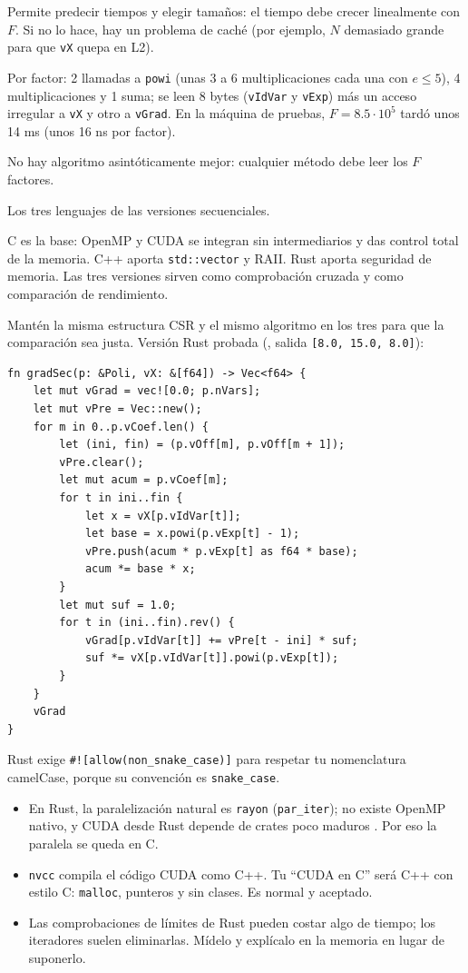 \porque Permite predecir tiempos y elegir tamaños: el tiempo debe crecer linealmente con $F$. Si no lo hace, hay un problema de caché (por ejemplo, $N$ demasiado grande para que \texttt{vX} quepa en L2).

\como Por factor: 2 llamadas a \texttt{powi} (unas 3 a 6 multiplicaciones cada una con $e\le5$), 4 multiplicaciones y 1 suma; se leen 8 bytes (\texttt{vIdVar} y \texttt{vExp}) más un acceso irregular a \texttt{vX} y otro a \texttt{vGrad}. En la máquina de pruebas, $F=8.5\cdot10^5$ tardó unos 14 ms (unos 16 ns por factor).

\alt No hay algoritmo asintóticamente mejor: cualquier método debe leer los $F$ factores.

\que Los tres lenguajes de las versiones secuenciales.

\porque C es la base: OpenMP y CUDA se integran sin intermediarios y das control total de la memoria. C++ aporta \texttt{std::vector} y RAII. Rust aporta seguridad de memoria. Las tres versiones sirven como comprobación cruzada y como comparación de rendimiento.

\como Mantén la misma estructura CSR y el mismo algoritmo en los tres para que la comparación sea justa. Versión Rust probada (, salida \texttt{[8.0, 15.0, 8.0]}):
\begin{lstlisting}
fn gradSec(p: &Poli, vX: &[f64]) -> Vec<f64> {
    let mut vGrad = vec![0.0; p.nVars];
    let mut vPre = Vec::new();
    for m in 0..p.vCoef.len() {
        let (ini, fin) = (p.vOff[m], p.vOff[m + 1]);
        vPre.clear();
        let mut acum = p.vCoef[m];
        for t in ini..fin {
            let x = vX[p.vIdVar[t]];
            let base = x.powi(p.vExp[t] - 1);
            vPre.push(acum * p.vExp[t] as f64 * base);
            acum *= base * x;
        }
        let mut suf = 1.0;
        for t in (ini..fin).rev() {
            vGrad[p.vIdVar[t]] += vPre[t - ini] * suf;
            suf *= vX[p.vIdVar[t]].powi(p.vExp[t]);
        }
    }
    vGrad
}
\end{lstlisting}
Rust exige \texttt{\#![allow(non\_snake\_case)]} para respetar tu nomenclatura camelCase, porque su convención es \texttt{snake\_case}.

\alt
\begin{itemize}
\item En Rust, la paralelización natural es \texttt{rayon} (\texttt{par\_iter}); no existe OpenMP nativo, y CUDA desde Rust depende de crates poco maduros \pv. Por eso la paralela se queda en C.
\item \texttt{nvcc} compila el código CUDA como C++. Tu ``CUDA en C'' será C++ con estilo C: \texttt{malloc}, punteros y sin clases. Es normal y aceptado.
\item Las comprobaciones de límites de Rust pueden costar algo de tiempo; los iteradores suelen eliminarlas. Mídelo y explícalo en la memoria en lugar de suponerlo.
\end{itemize}

